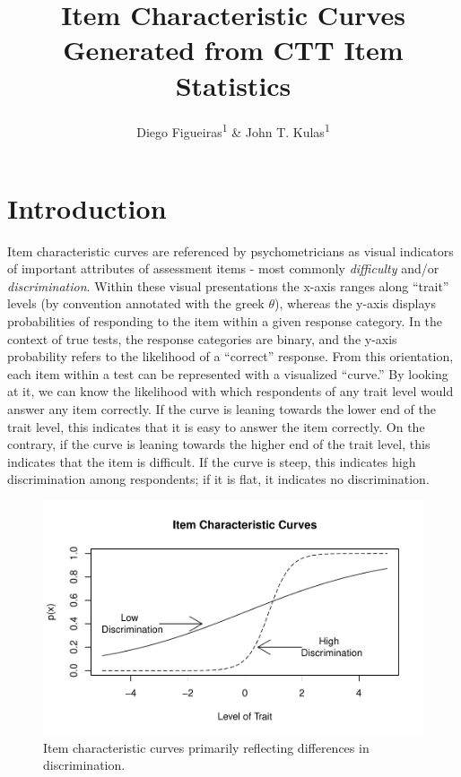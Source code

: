 \documentclass[
  english,
  man]{apa6}
\title{Item Characteristic Curves Generated from CTT Item Statistics}
\author{Diego Figueiras\textsuperscript{1} \& John T. Kulas\textsuperscript{1}}
\date{}
\affiliation{\vspace{0.5cm}\textsuperscript{1} Montclair State University}
\begin{document}
\maketitle

\hypertarget{introduction}{%
\section{Introduction}\label{introduction}}

Item characteristic curves are referenced by psychometricians as visual indicators of important attributes of assessment items - most commonly \emph{difficulty} and/or \emph{discrimination}. Within these visual presentations the x-axis ranges along ``trait'' levels (by convention annotated with the greek \(\theta\)), whereas the y-axis displays probabilities of responding to the item within a given response category. In the context of true tests, the response categories are binary, and the y-axis probability refers to the likelihood of a ``correct'' response. From this orientation, each item within a test can be represented with a visualized ``curve.'' By looking at it, we can know the likelihood with which respondents of any trait level would answer any item correctly. If the curve is leaning towards the lower end of the trait level, this indicates that it is easy to answer the item correctly. On the contrary, if the curve is leaning towards the higher end of the trait level, this indicates that the item is difficult. If the curve is steep, this indicates high discrimination among respondents; if it is flat, it indicates no discrimination.

\begin{figure}
\centering
\includegraphics{ICC_project_files/figure-latex/unnamed-chunk-1-1.pdf}
\caption{\label{fig:unnamed-chunk-1}Item characteristic curves primarily reflecting differences in discrimination.}
\end{figure}
\end{document}
